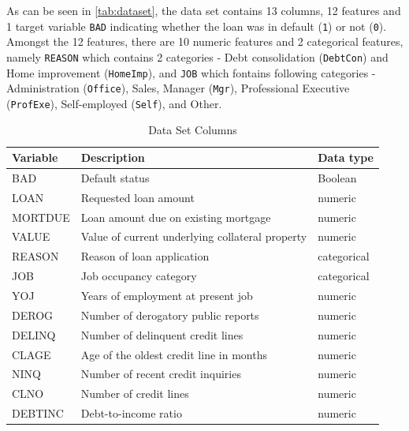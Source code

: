 As can be seen in \autoref{tab:dataset}, the data set contains 13 columns, 12 features and 1 target variable \texttt{BAD} indicating whether the loan was in default (\texttt{1}) or not (\texttt{0}). 
Amongst the 12 features, there are 10 numeric features and 2 categorical features, namely \texttt{REASON} which contains 2 categories - Debt consolidation (\texttt{DebtCon}) and Home improvement (\texttt{HomeImp}), and \texttt{JOB} which fontains following categories - Administration (\texttt{Office}), Sales, Manager (\texttt{Mgr}), Professional Executive (\texttt{ProfExe}), Self-employed (\texttt{Self}), and Other.


\begin{table}[H]
\small
\setlength{\tabcolsep}{8pt}
\renewcommand{\arraystretch}{1.3}
\centering
\caption[Data Set Columns]{Data Set Columns}\label{tab:dataset}
\begin{tabular}{@{} l p{8cm} l @{}}
\toprule
\textbf{Variable} & \textbf{Description} & \textbf{Data type}\\
\midrule
\hline
BAD & Default status & Boolean \\

LOAN & Requested loan amount & numeric \\

MORTDUE & Loan amount due on existing mortgage & numeric \\

VALUE & Value of current underlying collateral property & numeric \\

REASON & Reason of loan application & categorical \\
JOB & Job occupancy category & categorical \\

YOJ & Years of employment at present job & numeric \\

DEROG & Number of derogatory public reports & numeric \\

DELINQ & Number of delinquent credit lines & numeric \\

CLAGE & Age of the oldest credit line in months & numeric \\

NINQ & Number of recent credit inquiries & numeric \\

CLNO & Number of credit lines & numeric \\

DEBTINC & Debt-to-income ratio & numeric \\
\hline
\bottomrule
\end{tabular}
\vspace{0.35em}

\vspace{-1em}
\end{table}

